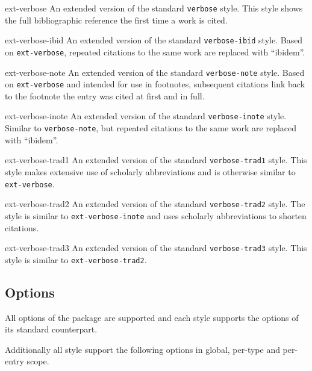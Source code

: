 \documentclass{ltxdockit}
\begin{document}
\begin{marglist}
\item[ext-verbose]
An extended version of the standard \texttt{verbose} style.
This style shows the full bibliographic reference the first time a work is
cited.

\item[ext-verbose-ibid]
An extended version of the standard \texttt{verbose-ibid} style.
Based on \texttt{ext-verbose}, repeated citations to the same work are replaced
with \enquote{ibidem}.

\item[ext-verbose-note]
An extended version of the standard \texttt{verbose-note} style.
Based on \texttt{ext-verbose} and intended for use in footnotes, subsequent
citations link back to the footnote the entry was cited at first and in full.

\item[ext-verbose-inote]
An extended version of the standard \texttt{verbose-inote} style.
Similar to \texttt{verbose-note}, but repeated citations to the same work are
replaced with \enquote{ibidem}.

\item[ext-verbose-trad1]
An extended version of the standard \texttt{verbose-trad1} style.
This style makes extensive use of scholarly abbreviations and is otherwise
similar to \texttt{ext-verbose}.

\item[ext-verbose-trad2]
An extended version of the standard \texttt{verbose-trad2} style.
The style is similar to \texttt{ext-\hspace{0pt}verbose-\hspace{0pt}inote} and
uses scholarly abbreviations to shorten citations.

\item[ext-verbose-trad3]
An extended version of the standard \texttt{verbose-trad3} style.
This style is similar to \texttt{ext-\hspace{0pt}verbose-\hspace{0pt}trad2}.
\end{marglist}


\subsection{Options}
All options of the  package are supported and each style supports
the options of its standard counterpart.

Additionally all style support the following options in global, per-type and
per-entry scope.
\end{document}
